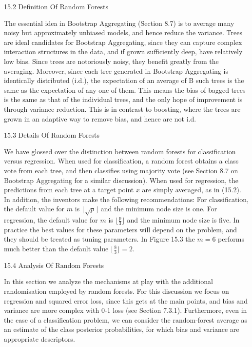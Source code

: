15.2 Definition Of Random Forests

The essential idea in Bootstrap Aggregating (Section 8.7) is to average many noisy but approximately unbiased models, and hence reduce the variance. Trees are ideal candidates for Bootstrap Aggregating, since they can capture complex interaction structures in the data, and if grown sufficiently deep, have relatively low bias. Since trees are notoriously noisy, they benefit greatly from the averaging. Moreover, since each tree generated in Bootstrap Aggregating is identically distributed (i.d.), the expectation of an average of B such trees is the same as the expectation of any one of them. This means the bias of bagged trees is the same as that of the individual trees, and the only hope of improvement is through variance reduction. This is in contrast to boosting, where the trees are grown in an adaptive way to remove bias, and hence are not i.d.

15.3 Details Of Random Forests

We have glossed over the distinction between random forests for classification versus regression. When used for classification, a random forest obtains a class vote from each tree, and then classifies using majority vote (see Section 8.7 on Bootstrap Aggregating for a similar discussion). When used for regression, the predictions from each tree at a target point $x$ are simply averaged, as in (15.2). In addition, the inventors make the following recommendations: For classification, the default value for $m$ is $\lfloor \sqrt{p} \rfloor$ and the minimum node size is one. For regression, the default value for $m$ is $\lfloor \frac{p}{3} \rfloor$ and the minimum node size is five. In practice the best values for these parameters will depend on the problem, and they should be treated as tuning parameters. In Figure 15.3 the $m=6$ performs much better than the default value $\lfloor \frac{8}{3} \rfloor = 2$.

15.4 Analysis Of Random Forests

In this section we analyze the mechanisms at play with the additional randomisation employed by random forests. For this discussion we focus on regression and squared error loss, since this gets at the main points, and bias and variance are more complex with 0-1 loss (see Section 7.3.1). Furthermore, even in the case of a classification problem, we can consider the random-forest average as an estimate of the class posterior probabilities, for which bias and variance are appropriate descriptors.

